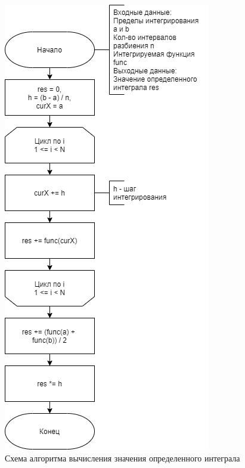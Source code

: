 \newpage 
\begin{figure}[h!]
	\begin{center}
		\includegraphics[scale=0.7]{assets/calculateIntegral.png}
	\end{center}
	\caption{Схема алгоритма вычисления значения определенного интеграла}
\end{figure}

